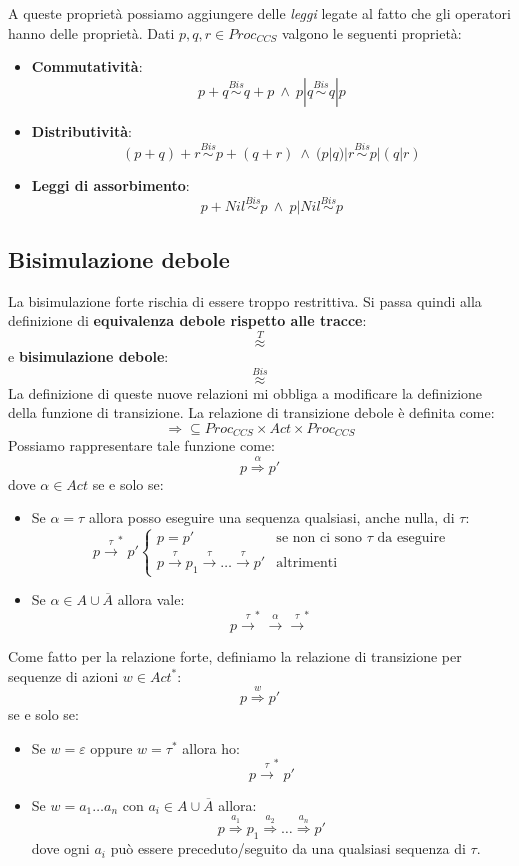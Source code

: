 A queste proprietà possiamo aggiungere delle \textit{leggi} legate al fatto che gli operatori hanno delle proprietà. Dati $p, q, r \in Proc_{CCS}$ valgono le seguenti proprietà:
\begin{itemize}
    \item \textbf{Commutatività}: $$p + q \stackrel{Bis}{\sim} q + p \ \land \ p | q \stackrel{Bis}{\sim} q | p$$
    \item \textbf{Distributività}: $$(p + q) + r \stackrel{Bis}{\sim} p + (q + r) \ \land \ (p | q) | r \stackrel{Bis}{\sim} p | (q | r)$$
    \item \textbf{Leggi di assorbimento}: $$p + Nil \stackrel{Bis}{\sim} p \ \land \ p | Nil \stackrel{Bis}{\sim} p$$
\end{itemize}
\subsection{Bisimulazione debole}
La bisimulazione forte rischia di essere troppo restrittiva. Si passa quindi alla definizione di \textbf{equivalenza debole rispetto alle tracce}: $$\stackrel{T}{\approx}$$ e \textbf{bisimulazione debole}: $$\stackrel{Bis}{\approx}$$
La definizione di queste nuove relazioni mi obbliga a modificare la definizione della funzione di transizione. La relazione di transizione debole è definita come: $$\Rightarrow \subseteq Proc_{CCS} \times Act \times Proc_{CCS}$$ Possiamo rappresentare tale funzione come: $$p \stackrel{\alpha}{\Rightarrow} p'$$ dove $\alpha \in Act$ se e solo se:
\begin{itemize}
    \item Se $\alpha = \tau$ allora posso eseguire una sequenza qualsiasi, anche nulla, di $\tau$: $$p \xrightarrow{\tau}^{\ast} p'\begin{cases}
        p = p' & \text{se non ci sono } \tau \text{ da eseguire} \\
        p \xrightarrow{\tau} p_1 \xrightarrow{\tau} \dots \xrightarrow{\tau} p' & \text{altrimenti}
    \end{cases}$$
    \item Se $\alpha \in A \cup \overline{A}$ allora vale: $$p \xrightarrow{\tau}^{\ast} \xrightarrow{\alpha} \xrightarrow{\tau}^{\ast}$$
\end{itemize}
Come fatto per la relazione forte, definiamo la relazione di transizione per sequenze di azioni $w \in Act^{\ast}$: $$p \stackrel{w}{\Rightarrow} p'$$ se e solo se:
\begin{itemize}
    \item Se $w = \varepsilon$ oppure $w = \tau^{\ast}$ allora ho: $$p \xrightarrow{\tau}^{\ast} p'$$
    \item Se $w = a_1\dots a_n$ con $a_i \in A \cup \overline{A}$ allora: $$p \stackrel{a_1}{\Rightarrow} p_1 \stackrel{a_2}{\Rightarrow} \dots \stackrel{a_n}{\Rightarrow} p'$$ dove ogni $a_i$ può essere preceduto/seguito da una qualsiasi sequenza di $\tau$.
\end{itemize}
